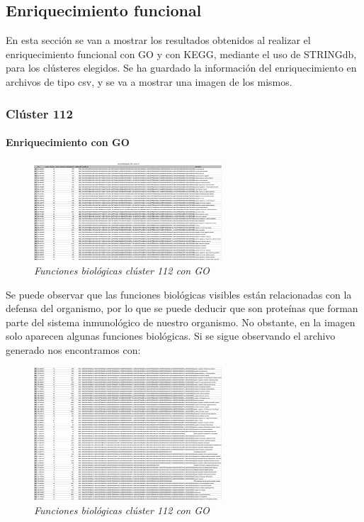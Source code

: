 \subsection{Enriquecimiento funcional}

En esta sección se van a mostrar los resultados obtenidos al realizar el enriquecimiento funcional con GO y con KEGG, mediante el uso de STRINGdb, para los clústeres elegidos.
Se ha guardado la información del enriquecimiento en archivos de tipo csv, y se va a mostrar una imagen de los mismos.

\subsubsection{Clúster 112}

\paragraph{Enriquecimiento con GO}

\begin{figure}
	\centering
	\includegraphics[width=70mm,scale=1.2]{figures/cluster112_GO.png}
	\caption{\textit{Funciones biológicas clúster 112 con GO}}
\end{figure}

Se puede observar que las funciones biológicas visibles están relacionadas con la defensa del organismo, por lo que se puede deducir que son proteínas que forman parte del sistema inmunológico de nuestro organismo. No obstante, en la imagen solo aparecen algunas funciones biológicas. Si se sigue observando el archivo generado nos encontramos con:

\begin{figure}
	\centering
	\includegraphics[width=70mm,scale=1.2]{figures/cluster112_GO_2.png}
	\caption{\textit{Funciones biológicas clúster 112 con GO}}
\end{figure}

